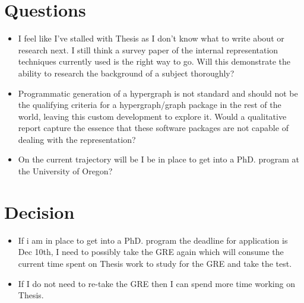\documentclass[12pt]{article}
\begin{document}
\section{Questions}
\begin{itemize}
\item I feel like I've stalled with Thesis as I don't know what to write about or research next. I still think a survey paper of the internal representation techniques currently used is the right way to go. Will this demonstrate the ability to research the background of a subject thoroughly?
\item Programmatic generation of a hypergraph is not standard and should not be the qualifying criteria for a hypergraph/graph package in the rest of the world, leaving this custom development to explore it. Would a qualitative report capture the essence that these software packages are not capable of dealing with the representation? 
\item On the current trajectory will be I be in place to get into a PhD. program at the University of Oregon?
\end{itemize}

\section{Decision}
\begin{itemize}
\item If i am in place to get into a PhD. program the deadline for application is Dec 10th, I need to possibly take the GRE again which will consume the current time spent on Thesis work to study for the GRE and take the test.
\item If I do not need to re-take the GRE then I can spend more time working on Thesis. 
\end{itemize}
\end{document}
